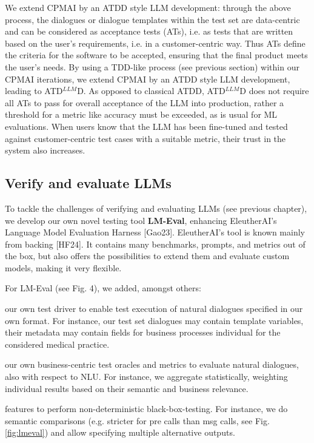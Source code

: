 \documentclass[twocolumn]{article}
\newcommand{\ATDLLMD}{ATD$^{LLM}$D}%
\begin{document}
We extend CPMAI by an ATDD style LLM development: through the above process, the dialogues or dialogue templates within the test set are data-centric and can be considered as acceptance tests (ATs), i.e. as tests that are written based on the user’s requirements, i.e. in a customer-centric way. Thus ATs define the criteria for the software to be accepted, ensuring that the final product meets the user's needs. By using a TDD-like process (see previous section) within our CPMAI iterations, we extend CPMAI by an ATDD style LLM development, leading to \ATDLLMD{}. As opposed to classical ATDD, \ATDLLMD{} does not require all ATs to pass for overall acceptance of the LLM into production, rather a threshold for a metric like accuracy must be exceeded, as is usual for ML evaluations. When users know that the LLM has been fine-tuned and tested against customer-centric test cases with a suitable metric, their trust in the system also increases.


\subsection{Verify and evaluate LLMs}

To tackle the challenges of verifying and evaluating LLMs (see previous chapter), we develop our own novel testing tool {\bfseries LM-Eval}, enhancing EleutherAI’s Language Model Evaluation Harness [Gao23]. EleutherAI’s tool is known mainly from backing [HF24]. It contains many benchmarks, prompts, and metrics out of the box, but also offers the possibilities to extend them and evaluate custom models, making it very flexible.

For LM-Eval (see Fig. 4), we added, amongst others:
\begin{compactitem}
\item our own test driver to enable test execution of natural dialogues specified in our own format. For instance, our test set dialogues may contain template variables, their metadata may contain fields for business processes individual for the considered medical practice.
\item our own business-centric test oracles and metrics to evaluate natural dialogues, also with respect to NLU. For instance, we aggregate statistically, weighting individual results based on their semantic and business relevance.
\item features to perform non-deterministic black-box-testing. For instance, we do semantic comparisons (e.g. stricter for pre calls than msg calls, see Fig. \ref{fig:lmeval}) and allow specifying multiple alternative outputs.
\end{compactitem}
\end{document}
